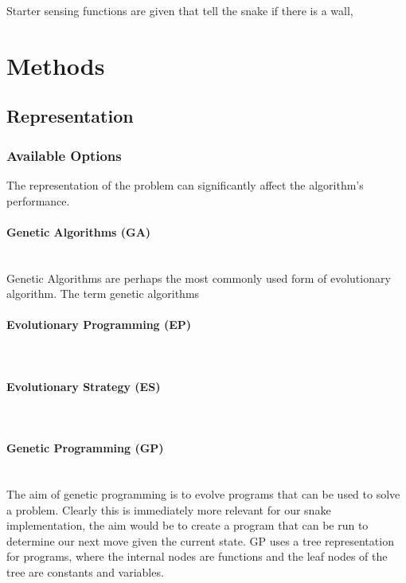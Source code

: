 \documentclass{article}
\newcommand{\myparagraph}[1]{\paragraph{#1}\mbox{}\\}
\begin{document}
Starter sensing functions are given that tell the snake if there is a wall, 

\section{Methods} %

\subsection{Representation}


\subsubsection{Available Options}
The representation of the problem can significantly affect the algorithm's performance. 


\myparagraph{Genetic Algorithms (GA)}
Genetic Algorithms are perhaps the most commonly used form of evolutionary algorithm. The term genetic algorithms

\myparagraph{Evolutionary Programming (EP)}

\myparagraph{Evolutionary Strategy (ES)}

\myparagraph{Genetic Programming (GP)}
The aim of genetic programming is to evolve programs that can be used to solve a problem. Clearly this is immediately more relevant for our snake implementation, the aim would be to create a program that can be run to determine our next move given the current state. GP uses a tree representation for programs, where the internal nodes are functions and the leaf nodes of the tree are constants and variables.
\end{document}
